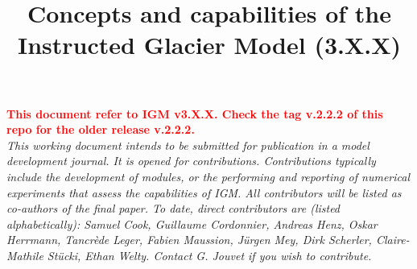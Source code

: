 \documentclass[gmd]{copernicus}
\begin{document}
\title{Concepts and capabilities of the Instructed Glacier Model (3.X.X)}








\received{}
\pubdiscuss{} %
\revised{}
\accepted{}
\published{}



\maketitle

{\textbf{\textcolor{red}{This document refer to IGM v3.X.X. Check the tag v.2.2.2 of this repo for the older release v.2.2.2. }}} \\

\textit{{This working document intends to be submitted for publication in a model development journal. It is opened for contributions. Contributions typically include the development of modules, or the performing and reporting of numerical experiments that assess the capabilities of IGM. All contributors will be listed as co-authors of the final paper. To date, direct contributors are (listed alphabetically): Samuel Cook, Guillaume Cordonnier, Andreas Henz, Oskar Herrmann, Tancrède Leger, Fabien Maussion, Jürgen Mey, Dirk Scherler, Claire-Mathile Stücki, Ethan Welty. Contact G. Jouvet if you wish to contribute.}} \\
\end{document}
